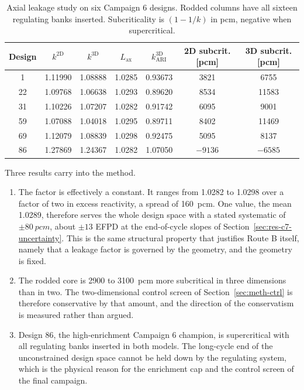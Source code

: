 \begin{table}[htbp]
  \centering
  \caption{Axial leakage study on six Campaign 6 designs. Rodded
  columns have all sixteen regulating banks inserted. Subcriticality
  is $(1 - 1/k)$ in pcm, negative when supercritical.}
  \label{tab:lax-study}
  \begin{tabular}{ccccccc}
    \toprule
    Design & $k^\mathrm{2D}$ & $k^\mathrm{3D}$ & $L_\mathrm{ax}$ & $k^\mathrm{3D}_\mathrm{ARI}$ & 2D subcrit. [pcm] & 3D subcrit. [pcm] \\
    \midrule
     1 & 1.11990 & 1.08888 & 1.0285 & 0.93673 &  3821 &  6755 \\
    22 & 1.09768 & 1.06638 & 1.0293 & 0.89620 &  8534 & 11583 \\
    31 & 1.10226 & 1.07207 & 1.0282 & 0.91742 &  6095 &  9001 \\
    59 & 1.07088 & 1.04018 & 1.0295 & 0.89711 &  8402 & 11469 \\
    69 & 1.12079 & 1.08839 & 1.0298 & 0.92475 &  5095 &  8137 \\
    86 & 1.27869 & 1.24367 & 1.0282 & 1.07050 & $-9136$ & $-6585$ \\
    \bottomrule
  \end{tabular}
\end{table}

Three results carry into the method.

\begin{enumerate}
  \item The factor is effectively a constant. It ranges from
        \num{1.0282} to \num{1.0298} over a factor of two in excess
        reactivity, a spread of \SI{160}{pcm}. One value, the mean
        \num{1.0289}, therefore serves the whole design space with a
        stated systematic of $\pm\SI{80}{pcm}$, about $\pm 13$ EFPD at
        the end-of-cycle slopes of Section~\ref{sec:res-c7-uncertainty}.
        This is the same structural property that justifies Route B
        itself, namely that a leakage factor is governed by the
        geometry, and the geometry is fixed.

  \item The rodded core is \num{2900} to \SI{3100}{pcm} more
        subcritical in three dimensions than in two. The
        two-dimensional control screen of Section~\ref{sec:meth-ctrl}
        is therefore conservative by that amount, and the direction of
        the conservatism is measured rather than argued.

  \item Design 86, the high-enrichment Campaign 6 champion, is
        supercritical with all regulating banks inserted in both
        models. The long-cycle end of the unconstrained design space
        cannot be held down by the regulating system, which is the
        physical reason for the enrichment cap and the control screen
        of the final campaign.
\end{enumerate}

